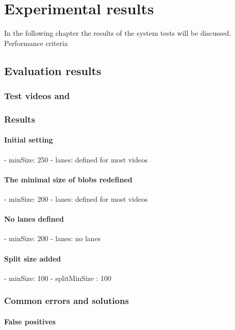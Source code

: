 \chapter{Experimental results}\label{chap:Tests}
In the following chapter the results of the system tests will be discussed. 
Performance criteria 
\section{Evaluation results}
\subsection{Test videos and }


\subsection{Results}
\subsubsection{Initial setting}
- minSize: 250
- lanes: defined for most videos

\subsubsection{The minimal size of blobs redefined}
- minSize: 200
- lanes: defined for most videos

\subsubsection{No lanes defined}
- minSize: 200
- lanes: no lanes

\subsubsection{Split size added}
- minSize: 100
- splitMinSize : 100

\subsection{Common errors and solutions}
\subsubsection{False positives}
